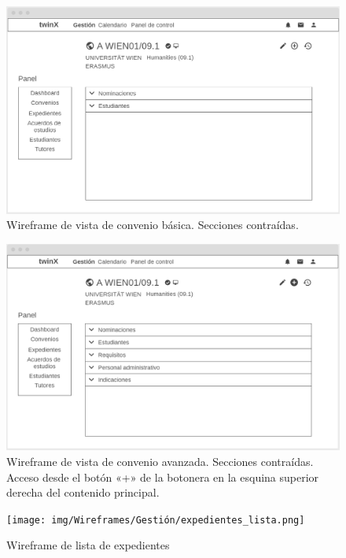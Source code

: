 \begin{figure}
\centering
\includegraphics[width=\textwidth]{img/Wireframes/Gestión/vista_convenio_básica_contraída.png}
\caption[Wireframe de vista de convenio básica]{Wireframe de vista de convenio básica. Secciones contraídas.}
\label{fig:vista_conv_básica_contWF}
\end{figure}

\begin{figure}
	\centering
	\includegraphics[width=\textwidth]{img/Wireframes/Gestión/vista_convenio_avanzada_contraída.png}
	\caption[Wireframe de vista de convenio avanzada]{Wireframe de vista de convenio avanzada. Secciones contraídas. Acceso desde el botón «+» de la botonera en la esquina superior derecha del contenido principal.}
	\label{fig:vista_conv_avanzada_contWF}
\end{figure}

\begin{figure}
	\centering
	\texttt{[image: img/Wireframes/Gestión/expedientes\_lista.png]}
	\caption{Wireframe de lista de expedientes}
	\label{fig:expedientes_listaWF}
\end{figure}

